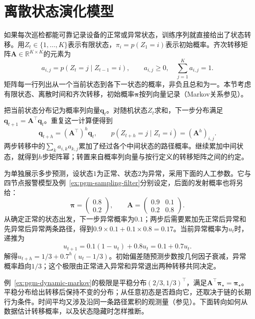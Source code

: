 \section{离散状态演化模型}
\label{sec:pgm-dynamic-discrete}

如果每次巡检都能可靠记录设备的正常或异常状态，训练序列就直接给出了状态转移。用$Z_t\in\{1,\ldots,K\}$表示有限状态，$\pi_i=p(Z_1=i)$表示初始概率。齐次转移矩阵$\bm{A}\in\mathbb{R}^{K\times K}$的元素为
\[
  a_{i,j}=p(Z_t=j\mid Z_{t-1}=i),\qquad
  a_{i,j}\geq0,\quad \sum_{j=1}^{K}a_{i,j}=1.
\]
矩阵每一行列出从一个当前状态到各下一状态的概率，非负且总和为一。本节考虑有限状态、离散时间和齐次转移，初始概率$\bm\pi$按列向量记录（Markov关系参见）。

把当前状态分布记为概率列向量$\bm{q}_t$。对随机状态$Z_t$求和，下一步分布满足$\bm{q}_{t+1}=\bm{A}^{\top}\bm{q}_t$。重复这一计算便得到
\begin{equation}
  \bm{q}_{t+h}=(\bm{A}^{\top})^h\bm{q}_t,\qquad
  p(Z_{t+h}=j\mid Z_t=i)=(\bm{A}^h)_{i,j}.
  \label{eq:pgm-dynamic-markov-prediction}
\end{equation}
两步转移中的$\sum_k a_{i,k}a_{k,j}$累加了经过各个中间状态的路径概率。继续累加中间状态，就得到$h$步矩阵幂；转置来自概率列向量与按行定义的转移矩阵之间的约定。

\begin{example}[两状态设备的多步预测]
  \label{ex:pgm-dynamic-markov}
  为单独展示多步预测，设状态$1$为正常、状态$2$为异常，采用下面的人工参数。它与四节点报警模型及例~\ref{ex:pgm-sampling-filter}分别设定，后面的发射概率也将另给：
  \[
    \bm{\pi}=\begin{pmatrix}0.8\\0.2\end{pmatrix},\qquad
    \bm{A}=
    \begin{pmatrix}0.9&0.1\\0.2&0.8\end{pmatrix}.
  \]
  从确定正常的状态出发，下一步异常概率为$0.1$；两步后需要累加先正常后异常和先异常后异常两条路径，得到$0.9\times0.1+0.1\times0.8=0.17$。当前异常概率为$u_t$时，递推为
  \[
    u_{t+1}=0.1(1-u_t)+0.8u_t=0.1+0.7u_t.
  \]
  解得$u_{t+h}=1/3+0.7^h(u_t-1/3)$。初始偏差随预测步数按几何因子衰减，异常概率趋向$1/3$；这个极限由正常进入异常和异常退出两种转移共同决定。
\end{example}

例~\ref{ex:pgm-dynamic-markov}的极限是平稳分布$(2/3,1/3)^\top$，满足$\bm A^\top\bm\pi_\star=\bm\pi_\star$。平稳分布给出转移后保持不变的分布；从任意初态是否趋向它，还取决于链的长期行为条件。时间平均又涉及沿同一条路径累积的观测量（参见）。下面转向如何从数据估计转移概率，以及状态隐藏时怎样推断。

